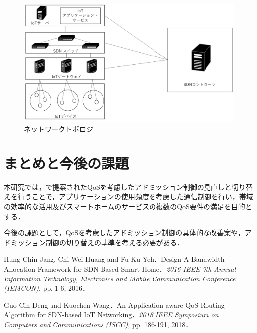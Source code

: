 \documentclass[a4paper,10pt,twocolumn,uplatex]{jsarticle}
\begin{document}
\begin{figure}[!tb]
  \centering
  \includegraphics[width=\linewidth]{img/AQRA_Architecture.pdf}
  \caption{ネットワークトポロジ}
  \label{fig:Architecture}
\end{figure}

\section{まとめと今後の課題}
本研究では，\cite{AQRA}で提案されたQoSを考慮したアドミッション制御の見直しと切り替えを行うことで，アプリケーションの使用頻度を考慮した通信制御を行い，帯域の効率的な活用及びスマートホームのサービスの複数のQoS要件の満足を目的とする．\par
今後の課題として，QoSを考慮したアドミッション制御の具体的な改善案や，アドミッション制御の切り替えの基準を考える必要がある．\par

\footnotesize{
  \begin{thebibliography}{99}
     Hung-Chin Jang, Chi-Wei Huang and Fu-Ku Yeh．Design A Bandwidth Allocation Framework for SDN Based Smart Home．\textit{2016 IEEE 7th Annual Information Technology, Electronics and Mobile Communication Conference (IEMCON)}, pp. 1-6, 2016．

     Guo-Cin Deng and Kuochen Wang．An Application-aware QoS Routing Algorithm for SDN-based IoT Networking．\textit{2018 IEEE Symposium on Computers and Communications (ISCC)}, pp. 186-191, 2018．
  \end{thebibliography}
}

\end{document}
